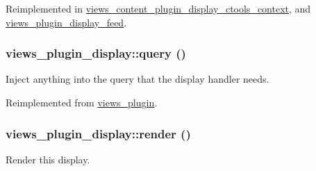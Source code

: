 Reimplemented in \hyperlink{classviews__content__plugin__display__ctools__context_a6e61452a3694e1bf66281b4a7456299a}{views\_\-content\_\-plugin\_\-display\_\-ctools\_\-context}, and \hyperlink{classviews__plugin__display__feed_ae5e20d2999e052f50486b5d03b4fb105}{views\_\-plugin\_\-display\_\-feed}.\hypertarget{classviews__plugin__display_aefdc473b5cbe1c7eb4d0f5175d02184a}{
\subsubsection[{query}]{\setlength{\rightskip}{0pt plus 5cm}views\_\-plugin\_\-display::query ()}}
\label{classviews__plugin__display_aefdc473b5cbe1c7eb4d0f5175d02184a}
Inject anything into the query that the display handler needs. 

Reimplemented from \hyperlink{classviews__plugin_a10ac07c47c4a8735786f9fcc38548587}{views\_\-plugin}.\hypertarget{classviews__plugin__display_acf230a4b44b452c9469f5df92e58e32e}{
\subsubsection[{render}]{\setlength{\rightskip}{0pt plus 5cm}views\_\-plugin\_\-display::render ()}}
\label{classviews__plugin__display_acf230a4b44b452c9469f5df92e58e32e}
Render this display. 

